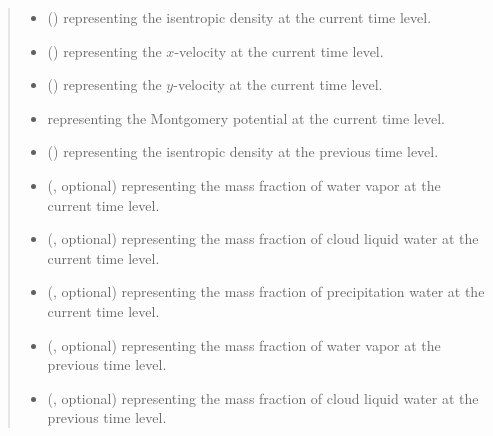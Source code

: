 \documentclass[letterpaper,10pt,english]{sphinxmanual}
\begin{document}
\begin{fulllineitems}
\begin{fulllineitems}
\begin{quote}
\begin{description}
\begin{itemize}
\item {} 
 () \textendash{}  representing the isentropic density at the current time level.

\item {} 
 () \textendash{}  representing the \(x\)-velocity at the current time level.

\item {} 
 () \textendash{}  representing the \(y\)-velocity at the current time level.

\item {} 
 \textendash{}  representing the Montgomery potential at the current time level.

\item {} 
 () \textendash{}  representing the isentropic density at the previous time level.

\item {} 
 (, optional) \textendash{}  representing the mass fraction of water vapor at the current time level.

\item {} 
 (, optional) \textendash{}  representing the mass fraction of cloud liquid water at the current time level.

\item {} 
 (, optional) \textendash{}  representing the mass fraction of precipitation water at the current time level.

\item {} 
 (, optional) \textendash{}  representing the mass fraction of water vapor at the previous time level.

\item {} 
 (, optional) \textendash{}  representing the mass fraction of cloud liquid water at the previous time level.


\end{itemize}
\end{description}
\end{quote}
\end{fulllineitems}
\end{fulllineitems}
\end{document}
